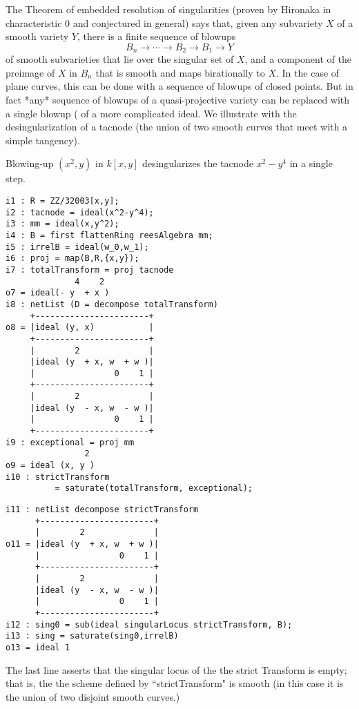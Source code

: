 \documentclass[twoside,12pt, leqno]{amsart}
\begin{document}
The Theorem of embedded resolution of singularities (proven by Hironaka in characteristic 0 and conjectured in general) says that, given any subvariety $X$ of a smooth variety $Y$, there is
a finite sequence of blowups 
$$
B_n \to \cdots \to B_2 \to B_1 \to Y
$$
of smooth subvarieties that lie over the singular set of $X$,  and a component of the preimage of
$X$ in $B_n$ that is smooth and maps birationally to $X$. In the case of plane curves, this can be done with a sequence of blowups of closed points. But in fact *any* sequence of blowups of a quasi-projective variety can be replaced with a single blowup (\cite[Theorem II.7.17]{H} of a more complicated ideal. We illustrate with the desingularization of a tacnode (the union of two smooth curves that meet with a simple tangency).

\begin{example}
Blowing-up $(x^2,y)$ in $k[x,y]$ desingularizes the tacnode $x^2-y^4$ in a single step. 
\end{example}
\begin{footnotesize}
 \begin{verbatim}
i1 : R = ZZ/32003[x,y];
i2 : tacnode = ideal(x^2-y^4);
i3 : mm = ideal(x,y^2);
i4 : B = first flattenRing reesAlgebra mm;
i5 : irrelB = ideal(w_0,w_1);
i6 : proj = map(B,R,{x,y});
i7 : totalTransform = proj tacnode
              4    2
o7 = ideal(- y  + x )
i8 : netList (D = decompose totalTransform)
     +-----------------------+
o8 = |ideal (y, x)           |
     +-----------------------+
     |        2              |
     |ideal (y  + x, w  + w )|
     |                0    1 |
     +-----------------------+
     |        2              |
     |ideal (y  - x, w  - w )|
     |                0    1 |
     +-----------------------+
i9 : exceptional = proj mm
                2
o9 = ideal (x, y )
i10 : strictTransform 
          = saturate(totalTransform, exceptional);
\end{verbatim}
\begin{verbatim}
i11 : netList decompose strictTransform
      +-----------------------+
      |        2              |
o11 = |ideal (y  + x, w  + w )|
      |                0    1 |
      +-----------------------+
      |        2              |
      |ideal (y  - x, w  - w )|
      |                0    1 |
      +-----------------------+
i12 : sing0 = sub(ideal singularLocus strictTransform, B);
i13 : sing = saturate(sing0,irrelB)
o13 = ideal 1
\end{verbatim}
\end{footnotesize}
The last line asserts that the singular locus of the the strict Transform is empty;
that is, the the scheme defined by ``strictTransform" is smooth (in this case it is the union
of two disjoint smooth curves.)
\end{document}
